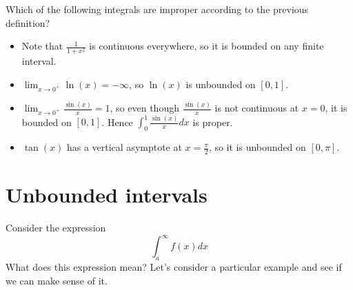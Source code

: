 \documentclass{ximera}
\begin{document}
\begin{question}
  Which of the following integrals are improper according to the previous definition?
  \begin{selectAll}
  \end{selectAll}

\begin{feedback}
\begin{itemize}
\item Note that $\frac{1}{1+x^2}$ is continuous everywhere, so it is bounded on any finite interval. 
\item $\lim_{x \to 0^+} \ln(x) = -\infty$, so $\ln(x)$ is unbounded on $[0,1]$.
\item $\lim_{x \to 0^+} \frac{\sin(x)}{x} = 1$, so even though $\frac{\sin(x)}{x}$ is not continuous at $x=0$, it is bounded on $[0,1]$.  Hence $\int_0^1 \frac{\sin(x)}{x} dx$ is proper.
\item $\tan(x)$ has a vertical asymptote at $x=\frac{\pi}{2}$, so it is unbounded on $[0,\pi]$.
\end{itemize}
\end{feedback}
\end{question}





\section{Unbounded intervals}


Consider the expression
\[ 
\int_{a}^{\infty} f(x) dx
\]
What does this expression mean?  Let's consider a particular example and see if we can make sense of it.
\end{document}
